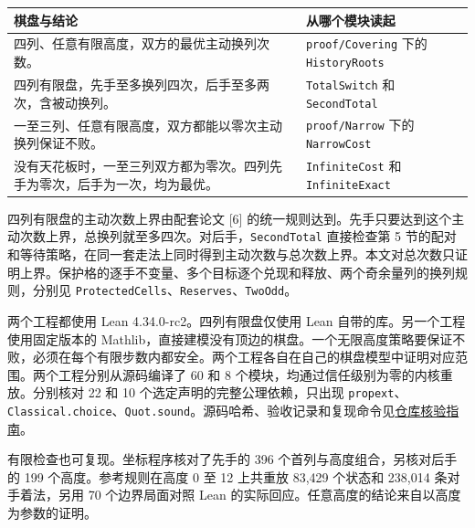 \documentclass[
  a4paper,
]{article}
\newcounter{none} %
\begin{document}
{\def\LTcaptype{none} %
\begin{longtable}[]{@{}
  >{\raggedright\arraybackslash}p{}
  >{\raggedright\arraybackslash}p{}@{}}
\toprule\noalign{}
\begin{minipage}[b]{\linewidth}\raggedright
棋盘与结论
\end{minipage} & \begin{minipage}[b]{\linewidth}\raggedright
从哪个模块读起
\end{minipage} \\
\midrule\noalign{}
\endhead
\bottomrule\noalign{}
\endlastfoot
四列、任意有限高度，双方的最优主动换列次数。 & \texttt{proof/Covering}
下的 \texttt{HistoryRoots} \\
四列有限盘，先手至多换列四次，后手至多两次，含被动换列。 &
\texttt{TotalSwitch} 和 \texttt{SecondTotal} \\
一至三列、任意有限高度，双方都能以零次主动换列保证不败。 &
\texttt{proof/Narrow} 下的 \texttt{NarrowCost} \\
没有天花板时，一至三列双方都为零次。四列先手为零次，后手为一次，均为最优。
& \texttt{InfiniteCost} 和 \texttt{InfiniteExact} \\
\end{longtable}
}

四列有限盘的主动次数上界由配套论文 {[}6{]}
的统一规则达到。先手只要达到这个主动次数上界，总换列就至多四次。对后手，\texttt{SecondTotal}
直接检查第 5
节的配对和等待策略，在同一套走法上同时得到主动次数与总次数上界。本文对总次数只证明上界。保护格的逐手不变量、多个目标逐个兑现和释放、两个奇余量列的换列规则，分别见
\texttt{ProtectedCells}、\texttt{Reserves}、\texttt{TwoOdd}。

两个工程都使用 Lean 4.34.0-rc2。四列有限盘仅使用 Lean
自带的库。另一个工程使用固定版本的
Mathlib，直接建模没有顶边的棋盘。一个无限高度策略要保证不败，必须在每个有限步数内都安全。两个工程各自在自己的棋盘模型中证明对应范围。两个工程分别从源码编译了
60 和 8 个模块，均通过信任级别为零的内核重放。分别核对 22 和 10
个选定声明的完整公理依赖，只出现
\texttt{propext}、\texttt{Classical.choice}、\texttt{Quot.sound}。源码哈希、验收记录和复现命令见\href{https://github.com/wugang6812/narrow-connect-four/blob/main/docs/verification.md}{仓库核验指南}。

有限检查也可复现。坐标程序核对了先手的 396
个首列与高度组合，另核对后手的 199 个高度。参考规则在高度 0 至 12
上共重放 83,429 个状态和 238,014 条对手着法，另用 70 个边界局面对照 Lean
的实际回应。任意高度的结论来自以高度为参数的证明。
\end{document}
